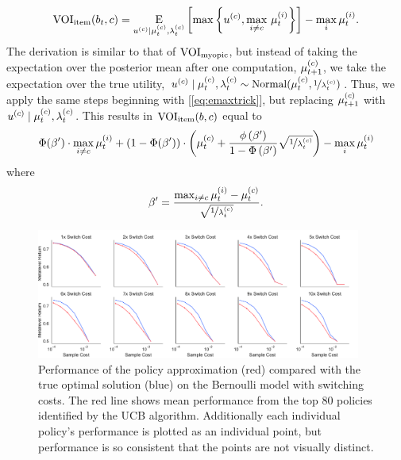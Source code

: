 \begin{equation*}
  \text{VOI}_\text{item}(b_t,c)=\operatorname*{E}_{u^{(c)} \mid \mu_{t}^{(c)}, \lambda_{t}^{(c)}} \left[
    \max \left\{ u^{(c)},\max_{i\neq c}\,\mu_t^{(i)} \right\}
  \right] -\max_{i}\mu_t^{(i)}.
\end{equation*}
%
The derivation is similar to that of $\text{VOI}_\text{myopic}$, but instead of taking the expectation over the posterior mean after one computation, $\mu_{t+1}^{(c)}$, we take the expectation over the true utility, $u^{(c)} \mid \mu_{t}^{(c)}, \lambda_{t}^{(c)} \sim \mathrm{Normal}(\mu_{t}^{(c)},\nicefrac{1}{\lambda_{t}^{(c)}})$. Thus, we apply the same steps beginning with [\ref{eq:emaxtrick}], but replacing $\mu_{t+1}^{(c)}$ with $u^{(c)} \mid \mu_{t}^{(c)}, \lambda_{t}^{(c)}$. This results in $\text{VOI}_\text{item}(b, c)$ equal to
%
%
\begin{equation*}
  \Phi(\beta')\cdot\max_{i\neq c}\mu_t^{(i)}+\left(1-\Phi(\beta')\right)\cdot\left(\mu_{t}^{(c)}+\frac{\phi\left(\beta'\right)}{1-\Phi\left(\beta'\right)}
  \sqrt{\nicefrac{1}{\lambda_{t}^{(c)}}}\right)
  - \max_{i}\mu_t^{(i)}
\end{equation*}
%
where 
%
\begin{equation*}
  \beta'=\frac{\max_{i\neq c}\mu_t^{(i)}-\mu_{t}^{(c)}}{\sqrt{\nicefrac{1}{\lambda_{t}^{(c)}}}}.
\end{equation*}
%


\begin{figure}[b!]
  
  \centering
  \includegraphics[width=0.95\textwidth]{figs/attention/supp-bernoulli.pdf}
  \caption{Performance of the policy approximation (red) compared with the true optimal solution (blue) on the Bernoulli model with switching costs. The red line shows mean performance from the top 80 policies identified by the UCB algorithm. Additionally each individual policy's performance is plotted as an individual point, but performance is so consistent that the points are not visually distinct.}
  \label{fig:attention-bernoulli}
  
\end{figure}  %

